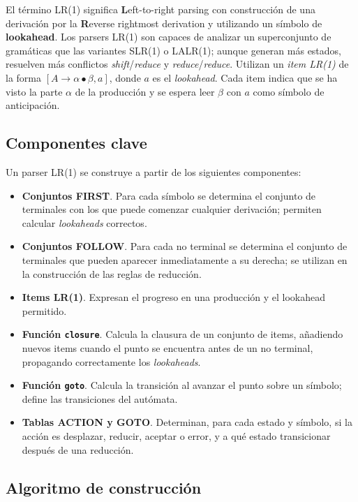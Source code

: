 \documentclass[12pt,a4paper]{article}
\begin{document}
El término LR(1) significa \textbf{L}eft-to-right parsing con construcción de una derivación por la \textbf{R}everse rightmost derivation y utilizando un símbolo de \textbf{lookahead}.  Los parsers LR(1) son capaces de analizar un superconjunto de gramáticas que las variantes SLR(1) o LALR(1); aunque generan más estados, resuelven más conflictos \emph{shift}/\emph{reduce} y \emph{reduce}/\emph{reduce}.  Utilizan un \emph{item LR(1)} de la forma $[A \to \alpha\bullet\beta, a]$, donde $a$ es el \emph{lookahead}.  Cada item indica que se ha visto la parte $\alpha$ de la producción y se espera leer $\beta$ con $a$ como símbolo de anticipación.

\subsection{Componentes clave}

Un parser LR(1) se construye a partir de los siguientes componentes:

\begin{itemize}
  \item \textbf{Conjuntos FIRST}.  Para cada símbolo se determina el conjunto de terminales con los que puede comenzar cualquier derivación; permiten calcular \emph{lookaheads} correctos.
  \item \textbf{Conjuntos FOLLOW}.  Para cada no terminal se determina el conjunto de terminales que pueden aparecer inmediatamente a su derecha; se utilizan en la construcción de las reglas de reducción.
  \item \textbf{Items LR(1)}.  Expresan el progreso en una producción y el lookahead permitido.
  \item \textbf{Función \texttt{closure}}.  Calcula la clausura de un conjunto de items, añadiendo nuevos items cuando el punto se encuentra antes de un no terminal, propagando correctamente los \emph{lookaheads}.
  \item \textbf{Función \texttt{goto}}.  Calcula la transición al avanzar el punto sobre un símbolo; define las transiciones del autómata.
  \item \textbf{Tablas ACTION y GOTO}.  Determinan, para cada estado y símbolo, si la acción es desplazar, reducir, aceptar o error, y a qué estado transicionar después de una reducción.
\end{itemize}

\subsection{Algoritmo de construcción}
\end{document}
